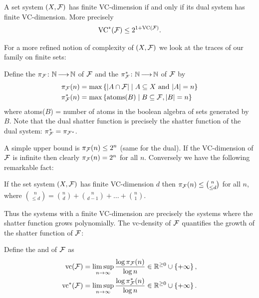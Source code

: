 \begin{Lemma} 
  A set system $(X, \mathcal F)$ has finite VC-dimension if and only if its dual system has finite VC-dimension.
  More precisely
  \begin{align*}
    \operatorname{VC}^*(\mathcal F) \leq 2^{1+\operatorname{VC}(\mathcal F)}.
  \end{align*}
\end{Lemma}

For a more refined notion of complexity of $(X, \mathcal F)$ we look at the traces of our family on finite sets:
\begin{Definition}
  Define the  $\pi_\mathcal F \colon \mathbb{N} \operatorname{\longrightarrow} \mathbb{N}$ of $\mathcal F$ and the  $\pi^*_\mathcal F \colon \mathbb{N} \operatorname{\longrightarrow} \mathbb{N}$ of $\mathcal F$ by 
  \begin{align*}
    \pi_\mathcal F(n) &= \max \left\{|A \cap \mathcal F| \mid A \subseteq X \text{ and } |A| = n\right\} \\
    \pi^*_\mathcal F(n) &= \max \left\{\text{atoms($B$)} \mid B \subseteq \mathcal F, |B| = n\right\}
  \end{align*}
  where atoms($B$) = number of atoms in the boolean algebra of sets generated by $B$.
  Note that the dual shatter function is precisely the shatter function of the dual system: $\pi^*_\mathcal F = \pi_{\mathcal F^*}$.
\end{Definition}  

A simple upper bound is $\pi_\mathcal F(n) \leq 2^n$ (same for the dual).
If the VC-dimension of $\mathcal F$ is infinite then clearly $\pi_\mathcal F(n) = 2^n$ for all $n$. Conversely we have the following remarkable fact:
\begin{Theorem} 
  If the set system $(X, \mathcal F)$ has finite VC-dimension $d$ then $\pi_\mathcal F(n) \leq {n \choose \leq d}$ for all $n$, where
  ${n \choose \leq d} = {n \choose d} + {n \choose d - 1} + \ldots + {n \choose 1}$.    
\end{Theorem}

Thus the systems with a finite VC-dimension are precisely the systems where the shatter function grows polynomially.
The vc-density of $\mathcal F$ quantifies the growth of the shatter function of $\mathcal F$: 
\begin{Definition}
  Define the  and  of $\mathcal F$ as
  \begin{align*}
    \operatorname{vc}(\mathcal F) &= \limsup_{n \to \infty}\frac{\log \pi_\mathcal F(n)}{\log n} \in \mathbb{R}^{\geq 0} \cup \left\{+\infty\right\},\\
    \operatorname{vc}^*(\mathcal F) &= \limsup_{n \to \infty}\frac{\log \pi^*_\mathcal F(n)}{\log n}\in \mathbb{R}^{\geq 0} \cup \left\{+\infty\right\}.
  \end{align*}
\end{Definition}

